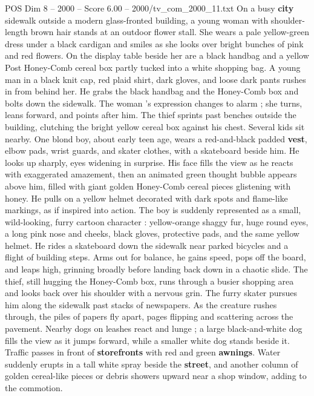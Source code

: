 \begin{textsample}{POS Dim 8 – 2000 – Score 6.00 – 2000/tv\_com\_2000\_11.txt}  \label{ex:f8_pos_018}
On a busy \textbf{city} sidewalk outside a modern glass-fronted building, a young woman with shoulder-length brown hair stands at an outdoor flower stall.
She wears a pale yellow-green dress under a black cardigan and smiles as she looks over bright bunches of pink and red flowers.
On the display table beside her are a black handbag and a yellow Post Honey-Comb cereal box partly tucked into a white shopping bag.
A young man in a black knit cap, red plaid shirt, dark gloves, and loose dark pants rushes in from behind her.
He grabs the black handbag and the Honey-Comb box and bolts down the sidewalk.
The woman ’s expression changes to alarm ; she turns, leans forward, and points after him.
The thief sprints past benches outside the building, clutching the bright yellow cereal box against his chest.
Several kids sit nearby.
One blond boy, about early teen age, wears a red-and-black padded \textbf{vest}, elbow pads, wrist guards, and skater clothes, with a skateboard beside him.
He looks up sharply, eyes widening in surprise.
His face fills the view as he reacts with exaggerated amazement, then an animated green thought bubble appears above him, filled with giant golden Honey-Comb cereal pieces glistening with honey.
He pulls on a yellow helmet decorated with dark spots and flame-like markings, as if inspired into action.
The boy is suddenly represented as a small, wild-looking, furry cartoon character : yellow-orange shaggy fur, huge round eyes, a long pink nose and cheeks, black gloves, protective pads, and the same yellow helmet.
He rides a skateboard down the sidewalk near parked bicycles and a flight of building steps.
Arms out for balance, he gains speed, pops off the board, and leaps high, grinning broadly before landing back down in a chaotic slide.
The thief, still hugging the Honey-Comb box, runs through a busier shopping area and looks back over his shoulder with a nervous grin.
The furry skater pursues him along the sidewalk past stacks of newspapers.
As the creature rushes through, the piles of papers fly apart, pages flipping and scattering across the pavement.
Nearby dogs on leashes react and lunge ; a large black-and-white dog fills the view as it jumps forward, while a smaller white dog stands beside it.
Traffic passes in front of \textbf{storefronts} with red and green \textbf{awnings}.
Water suddenly erupts in a tall white spray beside the \textbf{street}, and another column of golden cereal-like pieces or debris showers upward near a shop window, adding to the commotion.

\end{textsample}
